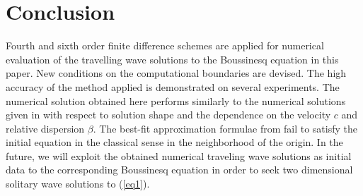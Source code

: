 \documentclass[preprint]{elsarticle}
\newcommand{\rf}[1]{(\ref{#1})}
\begin{document}
\section{Conclusion}
Fourth and sixth order finite difference schemes are applied for numerical evaluation of the travelling wave solutions to the Boussinesq equation in this paper. New conditions on the computational boundaries are devised. The high accuracy of the method applied is demonstrated on several experiments. The numerical solution obtained here performs similarly to the numerical solutions given in \cite{Ch2011,Ch2012} with respect to solution shape and the dependence on the velocity $c$ and relative dispersion $\beta$. 
The best-fit approximation formulae from  \cite{Ch2011} fail to satisfy the initial equation in the classical sense in the neighborhood of the origin. 
In the future, we will exploit the obtained numerical traveling wave solutions as initial data to the corresponding Boussinesq equation in order to seek two dimensional solitary wave solutions to \rf{eq1}.
\end{document}
